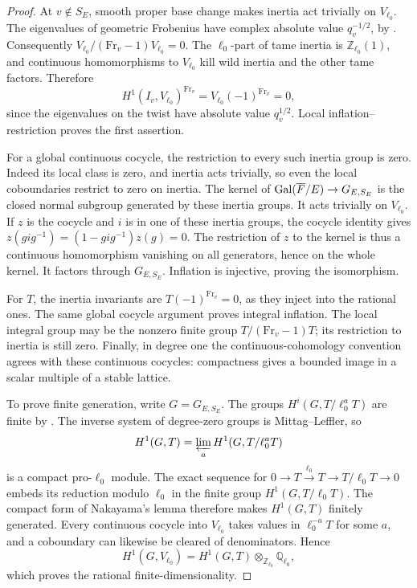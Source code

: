 \documentclass[11pt,a4paper]{article}
\theoremstyle{definition}
\newcommand{\Q}{\mathbb Q}\newcommand{\R}{\mathbb R}\newcommand{\C}{\mathbb C}
\newcommand{\Z}{\mathbb Z}\newcommand{\A}{\mathbb A}\newcommand{\Fbar}{\overline F}
\numberwithin{equation}{section}
\begin{document}
\begin{proof}
At \(v\notin S_E\), smooth proper base change makes inertia act
trivially on \(V_{\ell_0}\). The eigenvalues of geometric
Frobenius have complex absolute value \(q_v^{-1/2}\), by
\cite[Theorem~1.6]{DeligneWeil}. Consequently
\(V_{\ell_0}/(\mathrm{Fr}_v-1)V_{\ell_0}=0\).
The \(\ell_0\)-part of tame inertia is \(\Z_{\ell_0}(1)\),
and continuous homomorphisms to \(V_{\ell_0}\) kill wild inertia
and the other tame factors. Therefore
\[
 H^1(I_v,V_{\ell_0})^{\mathrm{Fr}_v}
   =V_{\ell_0}(-1)^{\mathrm{Fr}_v}=0,
\]
since the eigenvalues on the twist have absolute value
\(q_v^{1/2}\). Local inflation--restriction proves the first
assertion.

For a global continuous cocycle, the restriction to every such
inertia group is zero. Indeed its local class is zero, and
inertia acts trivially, so even the local coboundaries restrict to
zero on inertia. The kernel of
\(\Gal(\Fbar/E)\to G_{E,S_E}\) is the closed normal subgroup
generated by these inertia groups. It acts trivially on
\(V_{\ell_0}\). If \(z\) is the cocycle and \(i\) is in one
of these inertia groups, the cocycle identity gives
\(z(gig^{-1})=(1-gig^{-1})z(g)=0\).
The restriction of \(z\) to the kernel is thus a continuous
homomorphism vanishing on all generators, hence on the whole
kernel. It factors through \(G_{E,S_E}\). Inflation is
injective, proving the isomorphism.

For \(T\), the inertia invariants are
\(T(-1)^{\mathrm{Fr}_v}=0\), as they inject into the rational
ones. The same global cocycle argument proves integral inflation.
The local integral group may be the nonzero finite group
\(T/(\mathrm{Fr}_v-1)T\); its restriction to inertia is still
zero. Finally, in degree one the continuous-cohomology convention
agrees with these continuous cocycles: compactness gives a bounded
image in a scalar multiple of a stable lattice.

To prove finite generation, write \(G=G_{E,S_E}\). The groups
\(H^i(G,T/\ell_0^aT)\) are finite by
\cite[Corollary~I.4.15]{Milne}. The inverse system of degree-zero
groups is Mittag--Leffler, so
\[
 H^1(G,T)=\varprojlim_a H^1(G,T/\ell_0^aT)
\]
is a compact pro-\(\ell_0\) module. The exact sequence for
\(0\to T\xrightarrow{\ell_0}T\to T/\ell_0T\to0\)
embeds its reduction modulo \(\ell_0\) in the finite group
\(H^1(G,T/\ell_0T)\). The compact form of Nakayama's lemma
therefore makes \(H^1(G,T)\) finitely generated. Every continuous
cocycle into \(V_{\ell_0}\) takes values in
\(\ell_0^{-a}T\) for some \(a\), and a coboundary can likewise
be cleared of denominators. Hence
\[
 H^1(G,V_{\ell_0})=H^1(G,T)\otimes_{\Z_{\ell_0}}\Q_{\ell_0},
\]
which proves the rational finite-dimensionality.
\end{proof}
\end{document}
